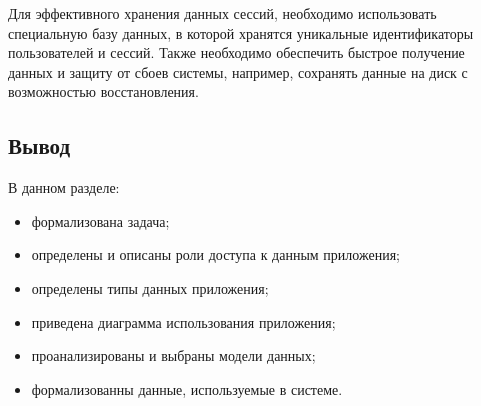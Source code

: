 Для эффективного хранения данных сессий, необходимо использовать специальную базу данных, в которой хранятся уникальные идентификаторы пользователей и сессий. Также необходимо обеспечить быстрое получение данных и защиту от сбоев системы, например, сохранять данные на диск с возможностью восстановления.

\subsection*{Вывод}
В данном разделе:

\begin{itemize}[leftmargin=1.6\parindent]
	\item формализована задача;
	\item определены и описаны роли доступа к  данным приложения;
	\item определены типы данных приложения;
	\item приведена диаграмма использования приложения;
	\item проанализированы и выбраны модели данных;
	\item формализованны данные, используемые в системе.
\end{itemize}



\pagebreak